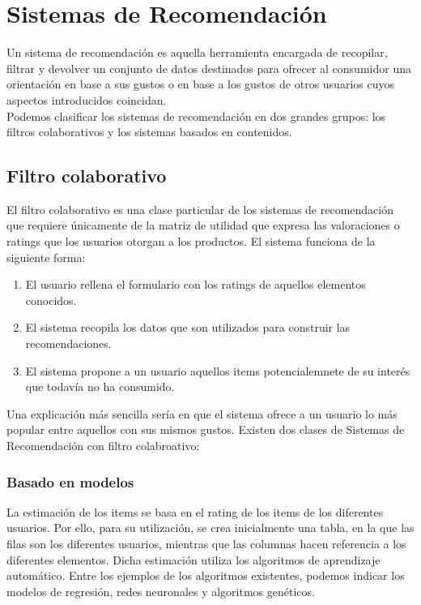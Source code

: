 \section{Sistemas de Recomendación}
Un sistema de recomendación es aquella herramienta encargada de recopilar, filtrar y devolver un conjunto de datos destinados para ofrecer al consumidor una orientación en base a sus gustos o en base a los gustos de otros usuarios cuyos aspectos introducidos coincidan.\nocite{wiki:recomendacion} \\
Podemos clasificar los sistemas de recomendación en dos grandes grupos: los filtros colaborativos y los sistemas basados en contenidos.
\subsection{Filtro colaborativo}
El filtro colaborativo es una clase particular de los sistemas de recomendación que requiere únicamente de la matriz de utilidad que expresa las valoraciones o ratings que los usuarios otorgan a los productos. El sistema funciona de la siguiente forma: \nocite{andres_gonzalez_sistemas_2014}
\begin{enumerate}
\item El usuario rellena el formulario con los ratings de aquellos elementos conocidos.
\item El sistema recopila los datos que son utilizados para construir las recomendaciones. \nocite{upf:recomendacion}
\item El sistema propone a un usuario aquellos items potencialemnete de su interés que todavía no ha consumido. \cite{wiki:filtrado}
\end{enumerate}
Una explicación más sencilla sería en que el sistema ofrece a un usuario lo más popular entre aquellos con sus mismos gustos.\nocite{ucm:recomendacion} 
Existen dos clases de Sistemas de Recomendación con filtro colabroativo: 
\subsubsection{Basado en modelos}
La estimación de los items se basa en el rating de los items de los diferentes usuarios. 
Por ello, para su utilización, se crea inicialmente una tabla, en la que las filas son los diferentes usuarios, mientras que las columnas hacen referencia a los diferentes elementos.
Dicha estimación utiliza los algoritmos de aprendizaje automático. Entre los ejemplos de los algoritmos existentes, podemos indicar los modelos de regresión, redes neuronales y algoritmos genéticos.


